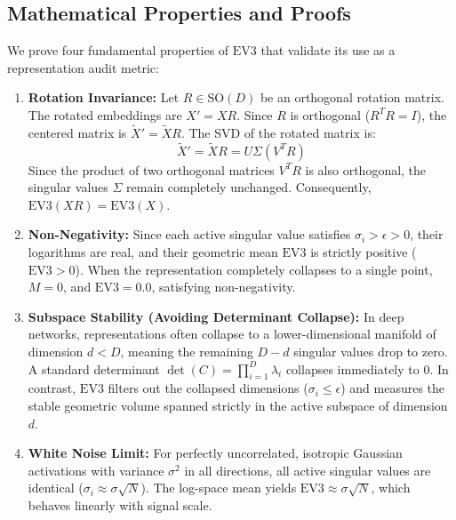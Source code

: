 \subsection{Mathematical Properties and Proofs}
We prove four fundamental properties of $\text{EV3}$ that validate its use as a representation audit metric:

\begin{enumerate}
    \item \textbf{Rotation Invariance:} Let $R \in \text{SO}(D)$ be an orthogonal rotation matrix. The rotated embeddings are $X' = X R$. Since $R$ is orthogonal ($R^T R = I$), the centered matrix is $\tilde{X}' = \tilde{X} R$. The SVD of the rotated matrix is:
    \begin{equation}
    \tilde{X}' = \tilde{X} R = U \Sigma (V^T R)
    \end{equation}
    Since the product of two orthogonal matrices $V^T R$ is also orthogonal, the singular values $\Sigma$ remain completely unchanged. Consequently, $\text{EV3}(X R) = \text{EV3}(X)$.
    
    \item \textbf{Non-Negativity:} Since each active singular value satisfies $\sigma_i > \epsilon > 0$, their logarithms are real, and their geometric mean $\text{EV3}$ is strictly positive ($\text{EV3} > 0$). When the representation completely collapses to a single point, $M=0$, and $\text{EV3} = 0.0$, satisfying non-negativity.
    
    \item \textbf{Subspace Stability (Avoiding Determinant Collapse):} In deep networks, representations often collapse to a lower-dimensional manifold of dimension $d < D$, meaning the remaining $D - d$ singular values drop to zero. A standard determinant $\det(C) = \prod_{i=1}^D \lambda_i$ collapses immediately to $0$. In contrast, $\text{EV3}$ filters out the collapsed dimensions ($\sigma_i \le \epsilon$) and measures the stable geometric volume spanned strictly in the active subspace of dimension $d$.
    
    \item \textbf{White Noise Limit:} For perfectly uncorrelated, isotropic Gaussian activations with variance $\sigma^2$ in all directions, all active singular values are identical ($\sigma_i \approx \sigma\sqrt{N}$). The log-space mean yields $\text{EV3} \approx \sigma\sqrt{N}$, which behaves linearly with signal scale.
\end{enumerate}

